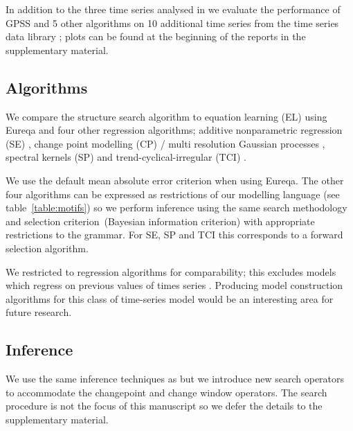 \documentclass{article}
\begin{document}
In addition to the three time series analysed in \cite{DuvLloGroetal13} we evaluate the performance of GPSS and 5 other algorithms on 10 additional time series from the time series data library \citep{TSDL}; plots can be found at the beginning of the reports in the supplementary material.

\subsection{Algorithms}

We compare the structure search algorithm to equation learning (EL) using Eureqa \citep{Eureqa} and four other regression algorithms; additive nonparametric regression (SE) \citep[e.g.][]{buja1989linear}, change point modelling (CP) / multi resolution Gaussian processes \citep[e.g.][]{garnett2010sequential, FoxDunson:NIPS2012}, spectral kernels (SP) \citep{WilAda13} and trend-cyclical-irregular (TCI) \citep[e.g.][]{lind2006basic}.

We use the default mean absolute error criterion when using Eureqa.
The other four algorithms can be expressed as restrictions of our modelling language (see table~\ref{table:motifs}) so we perform inference using the same search methodology and selection criterion\footnotemark~(Bayesian information criterion) with appropriate restrictions to the grammar.
For SE, SP and TCI this corresponds to a forward selection algorithm.

We restricted to regression algorithms for comparability; this excludes models which regress on previous values of times series \citep[e.g.][]{box2013time}.
Producing model construction algorithms for this class of time-series model would be an interesting area for future research.

\subsection{Inference}

We use the same inference techniques as \cite{DuvLloGroetal13} but we introduce new search operators to accommodate the changepoint and change window operators.
The search procedure is not the focus of this manuscript so we defer the details to the supplementary material.
\end{document}
